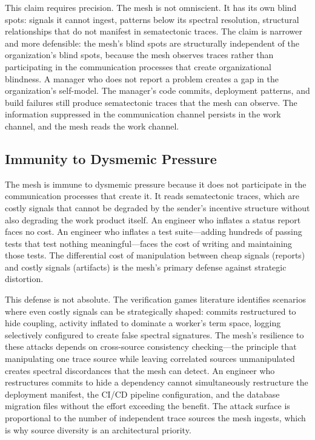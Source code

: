 \documentclass[11pt,a4paper]{article}
\begin{document}
This claim requires precision. The mesh is not omniscient. It has its own blind spots: signals it cannot ingest, patterns below its spectral resolution, structural relationships that do not manifest in sematectonic traces. The claim is narrower and more defensible: the mesh's blind spots are structurally independent of the organization's blind spots, because the mesh observes traces rather than participating in the communication processes that create organizational blindness. A manager who does not report a problem creates a gap in the organization's self-model. The manager's code commits, deployment patterns, and build failures still produce sematectonic traces that the mesh can observe. The information suppressed in the communication channel persists in the work channel, and the mesh reads the work channel.


\subsection{Immunity to Dysmemic Pressure}
\label{sec:dysmemic}

The mesh is immune to dysmemic pressure because it does not participate in the communication processes that create it. It reads sematectonic traces, which are costly signals that cannot be degraded by the sender's incentive structure without also degrading the work product itself. An engineer who inflates a status report faces no cost. An engineer who inflates a test suite---adding hundreds of passing tests that test nothing meaningful---faces the cost of writing and maintaining those tests. The differential cost of manipulation between cheap signals (reports) and costly signals (artifacts) is the mesh's primary defense against strategic distortion.

This defense is not absolute. The verification games literature identifies scenarios where even costly signals can be strategically shaped: commits restructured to hide coupling, activity inflated to dominate a worker's term space, logging selectively configured to create false spectral signatures. The mesh's resilience to these attacks depends on cross-source consistency checking---the principle that manipulating one trace source while leaving correlated sources unmanipulated creates spectral discordances that the mesh can detect. An engineer who restructures commits to hide a dependency cannot simultaneously restructure the deployment manifest, the CI/CD pipeline configuration, and the database migration files without the effort exceeding the benefit. The attack surface is proportional to the number of independent trace sources the mesh ingests, which is why source diversity is an architectural priority.
\end{document}
